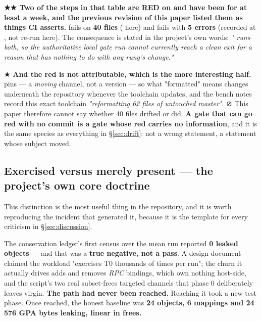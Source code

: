 \documentclass[10.5pt]{article}
\begin{document}
\begin{warnbox}\small
\textbf{★★ Two of the steps in that table are RED on  and have been for at least a
week, and the previous revision of this paper listed them as things CI asserts.}
 fails on \textbf{40 files} (\measured{} here) and
 fails with \textbf{5 errors}
(recorded at , not re-run here). The consequence is stated in the project's own
words: \emph{" runs both, so the authoritative local gate run cannot
currently reach a clean exit for a reason that has nothing to do with any rung's change."}

\smallskip
★ \textbf{And the  red is not attributable, which is the more interesting half.}
 pins  — a \emph{moving} channel, not a version
— so what "formatted" means changes underneath the repository whenever the toolchain updates, and
the bench notes record this exact toolchain \emph{"reformatting 62 files of untouched master"}.
⊘ This paper therefore cannot say whether 40 files drifted or  did. \textbf{A gate
that can go red with no commit is a gate whose red carries no information}, and it is the same
species as everything in \S\ref{sec:drift}: not a wrong statement, a statement whose subject
moved.
\end{warnbox}


\subsection{Exercised versus merely present --- the project's own core doctrine}

This distinction is the most useful thing in the repository, and it is worth reproducing the
incident that generated it, because it is the template for every criticism in
\S\ref{sec:discussion}.

\begin{warnbox}\small
The conservation ledger's first census over the mean run reported \textbf{0 leaked objects} —
and that was a \textbf{true negative, not a pass}. A design document claimed the workload
"exercises T0 thousands of times per run"; the churn it actually drives adds and removes
\emph{RPC} bindings, which own nothing host-side, and the script's two real subset-frees targeted
channels that phase 0 deliberately leaves virgin. \textbf{The path had never been reached.}
Reaching it took a new test phase. Once reached, the honest baseline was \textbf{24 objects, 6
mappings and 24\,576 GPA bytes leaking, linear in frees.}
\hfill {}
\end{warnbox}
\end{document}
